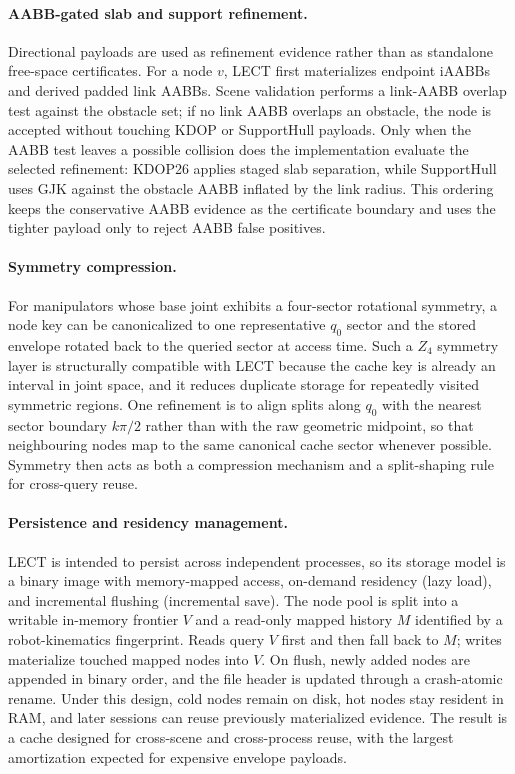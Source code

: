\documentclass[journal]{IEEEtran}
\newcommand{\iAABB}{\ensuremath{\mathrm{iAABB}}}
\begin{document}
\paragraph{AABB-gated slab and support refinement.}
Directional payloads are used as refinement evidence rather than as standalone
free-space certificates. For a node $v$, LECT first materializes endpoint
\iAABB{}s and derived padded link AABBs. Scene validation performs a link-AABB
overlap test against the obstacle set; if no link AABB overlaps an obstacle,
the node is accepted without touching KDOP or SupportHull payloads. Only when
the AABB test leaves a possible collision does the implementation evaluate the
selected refinement: KDOP26 applies staged slab separation, while SupportHull
uses GJK against the obstacle AABB inflated by the link radius. This ordering
keeps the conservative AABB evidence as the certificate boundary and uses the
tighter payload only to reject AABB false positives.

\paragraph{Symmetry compression.}
For manipulators whose base joint exhibits a four-sector rotational symmetry, a
node key can be canonicalized to one representative $q_0$ sector and the stored
envelope rotated back to the queried sector at access time. Such a $Z_4$
symmetry layer is structurally compatible with LECT because the cache key is
already an interval in joint space, and it reduces duplicate storage for
repeatedly visited symmetric regions. One refinement is to align splits
along $q_0$ with the nearest sector boundary $k\pi/2$ rather than with the raw
geometric midpoint, so that neighbouring nodes map to the same canonical cache
sector whenever possible. Symmetry then acts as both a compression mechanism
and a split-shaping rule for cross-query reuse.

\paragraph{Persistence and residency management.}
LECT is intended to persist across independent processes, so its storage model
is a binary image with memory-mapped access, on-demand residency (lazy load),
and incremental flushing (incremental save). The node pool is split into a writable in-memory frontier
$V$ and a read-only mapped history $M$ identified by a robot-kinematics
fingerprint. Reads query $V$ first and then fall back to $M$; writes
materialize touched mapped nodes into $V$. On flush, newly added nodes are
appended in binary order, and the file header is updated through a crash-atomic
rename. Under this design, cold nodes remain on disk, hot nodes stay resident
in RAM, and later sessions can reuse previously materialized evidence. The
result is a cache designed for cross-scene and cross-process reuse, with the
largest amortization expected for expensive envelope payloads.
\end{document}
